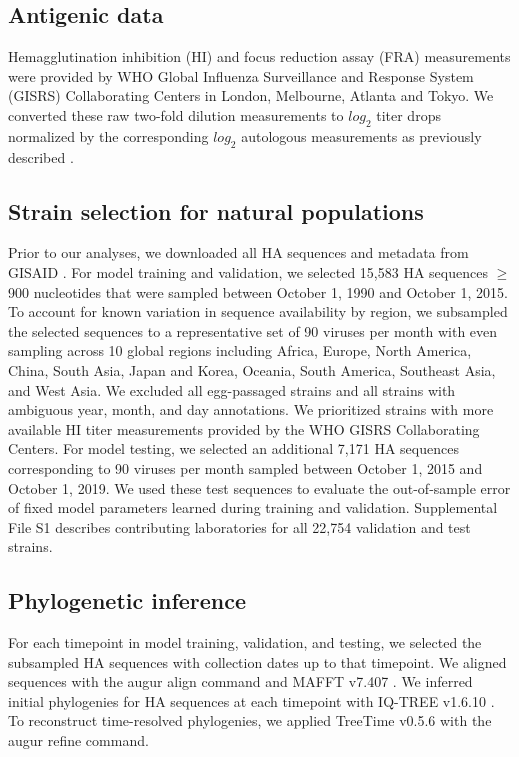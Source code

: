 \subsection{Antigenic data}

Hemagglutination inhibition (HI) and focus reduction assay (FRA) measurements were provided by WHO Global Influenza Surveillance and Response System (GISRS) Collaborating Centers in London, Melbourne, Atlanta and Tokyo.
We converted these raw two-fold dilution measurements to $log_{2}$ titer drops normalized by the corresponding $log_{2}$ autologous measurements as previously described \citep{Neher:2016hy}.

\subsection{Strain selection for natural populations}

Prior to our analyses, we downloaded all HA sequences and metadata from GISAID \citep{shu2017gisaid}.
For model training and validation, we selected 15,583 HA sequences $\geq$900 nucleotides that were sampled between October 1, 1990 and October 1, 2015.
To account for known variation in sequence availability by region, we subsampled the selected sequences to a representative set of 90 viruses per month with even sampling across 10 global regions including Africa, Europe, North America, China, South Asia, Japan and Korea, Oceania, South America, Southeast Asia, and West Asia.
We excluded all egg-passaged strains and all strains with ambiguous year, month, and day annotations.
We prioritized strains with more available HI titer measurements provided by the WHO GISRS Collaborating Centers.
For model testing, we selected an additional 7,171 HA sequences corresponding to 90 viruses per month sampled between October 1, 2015 and October 1, 2019.
We used these test sequences to evaluate the out-of-sample error of fixed model parameters learned during training and validation.
Supplemental File S1 describes contributing laboratories for all 22,754 validation and test strains.

\subsection{Phylogenetic inference}

For each timepoint in model training, validation, and testing, we selected the subsampled HA sequences with collection dates up to that timepoint.
We aligned sequences with the augur align command \citep{Hadfield2018} and MAFFT v7.407 \citep{Katoh2002}.
We inferred initial phylogenies for HA sequences at each timepoint with IQ-TREE v1.6.10 \citep{Nguyen2014}.
To reconstruct time-resolved phylogenies, we applied TreeTime v0.5.6 \citep{Sagulenko2018} with the augur refine command.

